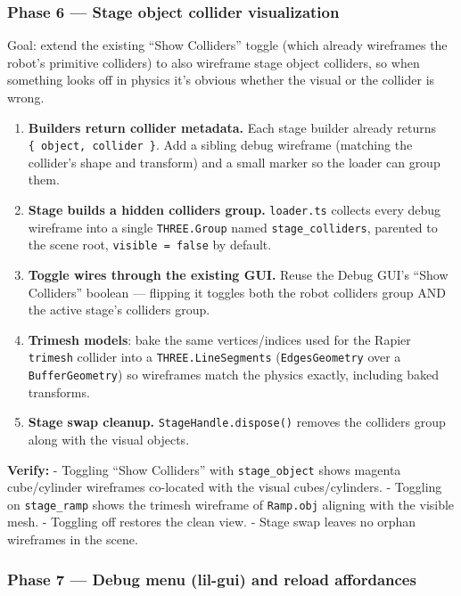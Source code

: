 \documentclass[
]{article}
\providecommand{\tightlist}{%
  \setlength{\itemsep}{0pt}\setlength{\parskip}{0pt}}
\begin{document}
\subsubsection{Phase 6 --- Stage object collider
visualization}\label{phase-6-stage-object-collider-visualization}

Goal: extend the existing ``Show Colliders'' toggle (which already
wireframes the robot's primitive colliders) to also wireframe stage
object colliders, so when something looks off in physics it's obvious
whether the visual or the collider is wrong.

\begin{enumerate}
\def\labelenumi{\arabic{enumi}.}
\tightlist
\item
  \textbf{Builders return collider metadata.} Each stage builder already
  returns \texttt{\{\ object,\ collider\ \}}. Add a sibling debug
  wireframe (matching the collider's shape and transform) and a small
  marker so the loader can group them.
\item
  \textbf{Stage builds a hidden colliders group.} \texttt{loader.ts}
  collects every debug wireframe into a single \texttt{THREE.Group}
  named \texttt{stage\_colliders}, parented to the scene root,
  \texttt{visible\ =\ false} by default.
\item
  \textbf{Toggle wires through the existing GUI.} Reuse the Debug GUI's
  ``Show Colliders'' boolean --- flipping it toggles both the robot
  colliders group AND the active stage's colliders group.
\item
  \textbf{Trimesh models}: bake the same vertices/indices used for the
  Rapier \texttt{trimesh} collider into a \texttt{THREE.LineSegments}
  (\texttt{EdgesGeometry} over a \texttt{BufferGeometry}) so wireframes
  match the physics exactly, including baked transforms.
\item
  \textbf{Stage swap cleanup.} \texttt{StageHandle.dispose()} removes
  the colliders group along with the visual objects.
\end{enumerate}

\textbf{Verify:} - Toggling ``Show Colliders'' with
\texttt{stage\_object} shows magenta cube/cylinder wireframes co-located
with the visual cubes/cylinders. - Toggling on \texttt{stage\_ramp}
shows the trimesh wireframe of \texttt{Ramp.obj} aligning with the
visible mesh. - Toggling off restores the clean view. - Stage swap
leaves no orphan wireframes in the scene.

\subsubsection{Phase 7 --- Debug menu (lil-gui) and reload
affordances}\label{phase-7-debug-menu-lil-gui-and-reload-affordances}
\end{document}
